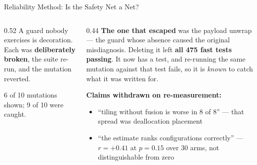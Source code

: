 \documentclass[10pt,aspectratio=169]{beamer}
\begin{document}
\begin{frame}{Reliability Method: Is the Safety Net a Net?}
\begin{columns}[T,totalwidth=0.99\textwidth]
\begin{column}{0.52\textwidth}
A guard nobody exercises is decoration. Each was \textbf{deliberately broken},
the suite re-run, and the mutation reverted.

\vspace{0.15cm}
\centering
{}

\vspace{0.05cm}
\footnotesize 6 of 10 mutations shown; 9 of 10 were caught.
\end{column}

\begin{column}{0.44\textwidth}
\textbf{The one that escaped} was the payload unwrap --- the guard whose
absence caused the original misdiagnosis. Deleting it left \textbf{all 475
fast tests passing}. It now has a test, and re-running the same mutation
against that test fails, so it is \emph{known} to catch what it was written
for.

\vspace{0.25cm}
\textbf{Claims withdrawn on re-measurement:}
\begin{itemize}
\small
\item ``tiling without fusion is worse in 8 of 8'' --- that spread was deallocation placement
\item ``the estimate ranks configurations correctly'' --- $r=+0.41$ at $p=0.15$ over 30 arms, not distinguishable from zero
\end{itemize}
\end{column}
\end{columns}


\end{frame}
\end{document}
